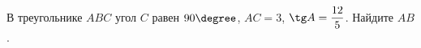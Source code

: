 \begin{ex}
	\begin{condition}
		В треугольнике \( ABC \) угол \( C \) равен \( 90\degree \), \( AC=3 \),  \( \tg A=\dfrac{12}{5} \). Найдите \( AB \).
	\end{condition}
\end{ex}